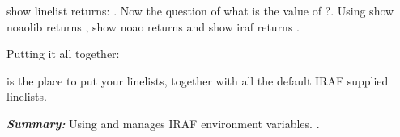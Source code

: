 show linelist returns:  . Now the question of
what is the value of ?. Using show noaolib returns
, show noao returns  and show iraf
returns .

Putting it all together:


is the place to put your linelists, together with all the default IRAF
supplied linelists.


\textbf{\emph{Summary:}} Using  and  manages IRAF
environment variables. .
